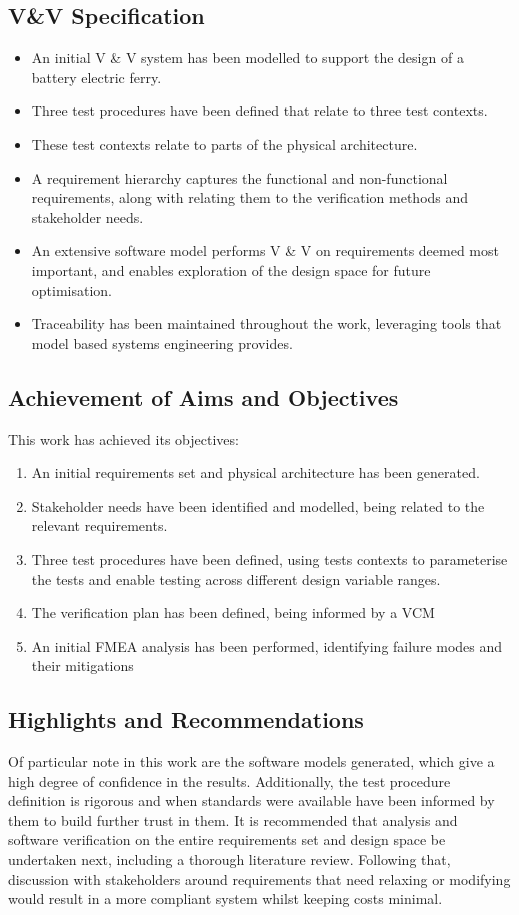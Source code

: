 \documentclass[../main.tex]{subfiles}
\begin{document}
    
\subsection{V\&V Specification}
\begin{itemize}
    \item An initial V \& V system has been modelled to support the design of a battery electric ferry.
    \item Three test procedures have been defined that relate to three test contexts.
    \item These test contexts relate to parts of the physical architecture.
    \item A requirement hierarchy captures the functional and non-functional requirements, along with relating them to the verification methods and stakeholder needs.
    \item An extensive software model performs V \& V on requirements deemed most important, and enables exploration of the design space for future optimisation.
    \item Traceability has been maintained throughout the work, leveraging tools that model based systems engineering provides.
\end{itemize}

\subsection{Achievement of Aims and Objectives}

This work has achieved its objectives:
\begin{enumerate}
    \item An initial requirements set and physical architecture has been generated.
    \item Stakeholder needs have been identified and modelled, being related to the relevant requirements.
    \item Three test procedures have been defined, using tests contexts to parameterise the tests and enable testing across different design variable ranges.
    \item The verification plan has been defined, being informed by a VCM
    \item An initial FMEA analysis has been performed, identifying failure modes and their mitigations
\end{enumerate}

\subsection{Highlights and Recommendations}
Of particular note in this work are the software models generated, which give a high degree of confidence in the results.
Additionally, the test procedure definition is rigorous and when standards were available have been informed by them to build further trust in them.
It is recommended that analysis and software verification on the entire requirements set and design space be undertaken next, including a thorough literature review. 
Following that, discussion with stakeholders around requirements that need relaxing or modifying would result in a more compliant system whilst keeping costs minimal.
\end{document}
